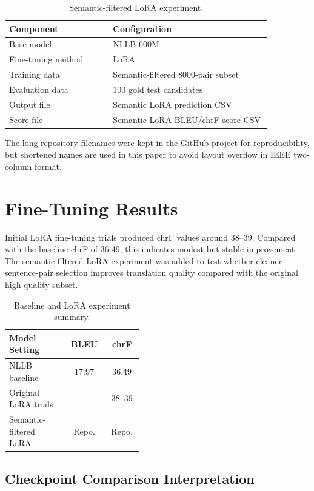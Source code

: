 \documentclass[conference]{IEEEtran}
\begin{document}
\begin{table}[H]
\centering
\caption{Semantic-filtered LoRA experiment.}
\footnotesize
\begin{tabular}{p{0.34\linewidth}p{0.52\linewidth}}
\toprule
\textbf{Component} & \textbf{Configuration} \\
\midrule
Base model & NLLB 600M \\
Fine-tuning method & LoRA \\
Training data & Semantic-filtered 8000-pair subset \\
Evaluation data & 100 gold test candidates \\
Output file & Semantic LoRA prediction CSV \\
Score file & Semantic LoRA BLEU/chrF score CSV \\
\bottomrule
\end{tabular}
\end{table}

The long repository filenames were kept in the GitHub project for reproducibility, but shortened names are used in this paper to avoid layout overflow in IEEE two-column format.

\section{Fine-Tuning Results}

Initial LoRA fine-tuning trials produced chrF values around 38--39. Compared with the baseline chrF of 36.49, this indicates modest but stable improvement. The semantic-filtered LoRA experiment was added to test whether cleaner sentence-pair selection improves translation quality compared with the original high-quality subset.

\begin{table}[H]
\centering
\caption{Baseline and LoRA experiment summary.}
\footnotesize
\begin{tabular}{p{0.44\linewidth}cc}
\toprule
\textbf{Model Setting} & \textbf{BLEU} & \textbf{chrF} \\
\midrule
NLLB baseline & 17.97 & 36.49 \\
Original LoRA trials & -- & 38--39 \\
Semantic-filtered LoRA & Repo. & Repo. \\
\bottomrule
\end{tabular}
\end{table}

\subsection{Checkpoint Comparison Interpretation}
\end{document}
